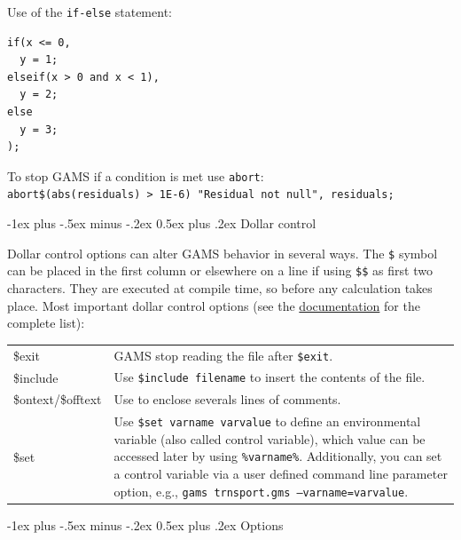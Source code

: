 \documentclass[10pt,landscape,a4paper]{article}
\makeatletter
\renewcommand{\section}{\@startsection{section}{1}{0mm}%
                                {-1ex plus -.5ex minus -.2ex}%
                                {0.5ex plus .2ex}%
                                {\color{blue}\normalfont\large\bfseries}}
\makeatother
\begin{document}
\begin{multicols}{2}
Use of the \verb!if-else! statement:\\
\begin{verbatim}
if(x <= 0,
  y = 1;
elseif(x > 0 and x < 1),
  y = 2;
else
  y = 3;
);
\end{verbatim}

To stop GAMS if a condition is met use \verb!abort!:\\
\verb!abort$(abs(residuals) > 1E-6) "Residual not null", residuals;!

\section{Dollar control}

Dollar control options can alter GAMS behavior in several ways. The \texttt{\$}
symbol can be placed in the first column or elsewhere on a line if using
\texttt{\$\$} as first two characters. They are executed at compile time, so
before any calculation takes place. Most important dollar control options (see
the
\href{http://www.gams.com/help/topic/gams.doc/userguides/userguide/_u_g__dollar_control_options.html?cp=0_2_0_2_3_1#UG_DollarControl_ListOfDollarControlOptions}{documentation}
for the complete list):
\begin{tabularx}{\columnwidth}{@{}>{\ttfamily}lX@{}}
\$exit & GAMS stop reading the file after \texttt{\$exit}.\\
\$include & Use \texttt{\$include filename} to insert the contents of the
file.\\
\$ontext\textrm{/}\$offtext & Use to enclose severals lines of comments.\\
\$set & Use \texttt{\$set varname varvalue} to define an environmental
variable (also called control variable), which value can be accessed later by using
\texttt{\%varname\%}. Additionally, you can set a control variable via a user defined
command line parameter option, e.g., \texttt{gams~trnsport.gms --varname=varvalue}.
\end{tabularx}

\section{Options}


\end{multicols}
\end{document}
